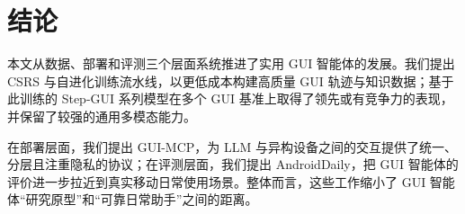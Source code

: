 \section{结论}

本文从数据、部署和评测三个层面系统推进了实用 GUI 智能体的发展。我们提出 CSRS 与自进化训练流水线，以更低成本构建高质量 GUI 轨迹与知识数据；基于此训练的 Step-GUI 系列模型在多个 GUI 基准上取得了领先或有竞争力的表现，并保留了较强的通用多模态能力。

在部署层面，我们提出 GUI-MCP，为 LLM 与异构设备之间的交互提供了统一、分层且注重隐私的协议；在评测层面，我们提出 AndroidDaily，把 GUI 智能体的评价进一步拉近到真实移动日常使用场景。整体而言，这些工作缩小了 GUI 智能体“研究原型”和“可靠日常助手”之间的距离。
